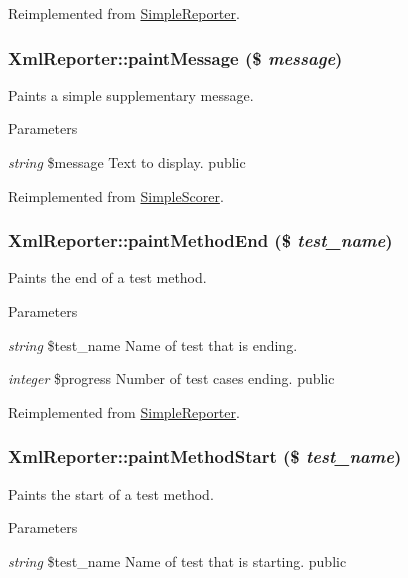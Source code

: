 Reimplemented from \hyperlink{class_simple_reporter_a682fc7003bca1442734b7ddbdf270b75}{SimpleReporter}.\hypertarget{class_xml_reporter_af7b86039a6d741e8d5d86d6e85bcc82d}{
\subsubsection[{paintMessage}]{\setlength{\rightskip}{0pt plus 5cm}XmlReporter::paintMessage (\$ {\em message})}}
\label{class_xml_reporter_af7b86039a6d741e8d5d86d6e85bcc82d}
Paints a simple supplementary message. 
\begin{DoxyParams}{Parameters}
\item[{\em string}]\$message Text to display.  public \end{DoxyParams}


Reimplemented from \hyperlink{class_simple_scorer_a7f36f3898644df27fa84eb506ae706ca}{SimpleScorer}.\hypertarget{class_xml_reporter_ae021130f96f98f7ff693740c331c31ae}{
\subsubsection[{paintMethodEnd}]{\setlength{\rightskip}{0pt plus 5cm}XmlReporter::paintMethodEnd (\$ {\em test\_\-name})}}
\label{class_xml_reporter_ae021130f96f98f7ff693740c331c31ae}
Paints the end of a test method. 
\begin{DoxyParams}{Parameters}
\item[{\em string}]\$test\_\-name Name of test that is ending. \item[{\em integer}]\$progress Number of test cases ending.  public \end{DoxyParams}


Reimplemented from \hyperlink{class_simple_reporter_a0ad8baf509606e35dec1bbefddef3fc0}{SimpleReporter}.\hypertarget{class_xml_reporter_a9d879c209e50eadfcdbd8e3bfc7ba226}{
\subsubsection[{paintMethodStart}]{\setlength{\rightskip}{0pt plus 5cm}XmlReporter::paintMethodStart (\$ {\em test\_\-name})}}
\label{class_xml_reporter_a9d879c209e50eadfcdbd8e3bfc7ba226}
Paints the start of a test method. 
\begin{DoxyParams}{Parameters}
\item[{\em string}]\$test\_\-name Name of test that is starting.  public \end{DoxyParams}


